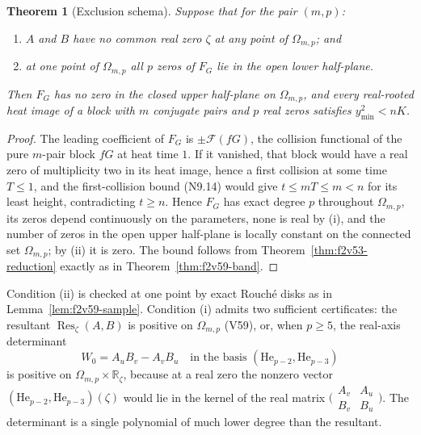 \documentclass[11pt]{article}
\newtheorem{theorem}{Theorem}[section]
\theoremstyle{definition}
\theoremstyle{remark}
\begin{document}
\begin{theorem}[Exclusion schema]
\label{thm:f2v60-schema}
Suppose that for the pair \((m,p)\):
\begin{enumerate}[label=\textup{(\roman*)}]
\item \(A\) and \(B\) have no common real zero \(\zeta\) at any point
of \(\Omega_{m,p}\); and
\item at one point of \(\Omega_{m,p}\) all \(p\) zeros of \(F_G\) lie
in the open lower half-plane.
\end{enumerate}
Then \(F_G\) has no zero in the closed upper half-plane on
\(\Omega_{m,p}\), and every real-rooted heat image of a block with
\(m\) conjugate pairs and \(p\) real zeros satisfies
\(y_{\min}^2<nK\).
\end{theorem}

\begin{proof}
The leading coefficient of \(F_G\) is \(\pm\mathcal F(fG)\), the
collision functional of the pure \(m\)-pair block \(fG\) at heat time
\(1\).  If it vanished, that block would have a real zero of
multiplicity two in its heat image, hence a first collision at some
time \(T\le1\), and the first-collision bound \textup{(N9.14)} would
give \(t\le mT\le m<n\) for its least height, contradicting
\(t\ge n\).  Hence \(F_G\) has exact degree
\(p\) throughout \(\Omega_{m,p}\), its zeros depend continuously on the
parameters, none is real by (i), and the number of zeros in the open
upper half-plane is locally constant on the connected set
\(\Omega_{m,p}\); by (ii) it is zero.  The bound follows from
Theorem~\ref{thm:f2v53-reduction} exactly as in
Theorem~\ref{thm:f2v59-band}.
\end{proof}

Condition (ii) is checked at one point by exact Rouch\'{e} disks as in
Lemma~\ref{lem:f2v59-sample}.  Condition (i) admits two sufficient
certificates: the resultant \(\operatorname{Res}_\zeta(A,B)\) is
positive on \(\Omega_{m,p}\) (V59), or, when \(p\ge5\), the
real-axis determinant
\begin{equation}
 W_0=A_uB_v-A_vB_u\quad\text{in the basis }(\mathrm{He}_{p-2},\mathrm{He}_{p-3})
 \label{eq:f2v60-W0}
\end{equation}
is positive on \(\Omega_{m,p}\times\mathbb R_\zeta\), because at a real
zero the nonzero vector \((\mathrm{He}_{p-2},\mathrm{He}_{p-3})(\zeta)\)
would lie in the kernel of the real matrix
\(\bigl(\begin{smallmatrix}A_v&A_u\\B_v&B_u\end{smallmatrix}\bigr)\).
The determinant is a single polynomial of much lower degree than the
resultant.
\end{document}
